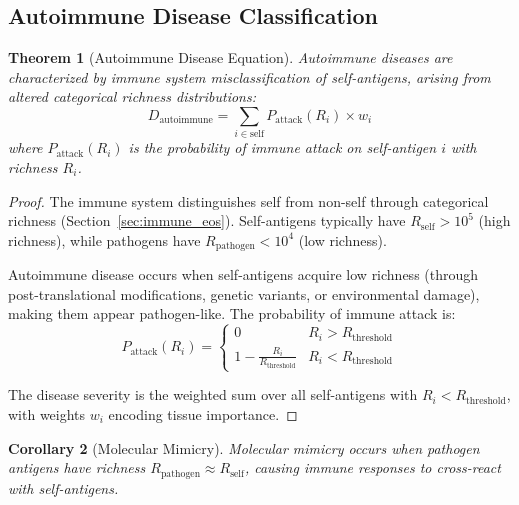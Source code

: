 \documentclass[11pt,twocolumn,a4paper]{article}
\newtheorem{theorem}{Theorem}[section]
\newtheorem{corollary}[theorem]{Corollary}
\theoremstyle{definition}
\theoremstyle{remark}
\begin{document}
\subsection{Autoimmune Disease Classification}

\begin{theorem}[Autoimmune Disease Equation]
\label{thm:autoimmune_disease}
Autoimmune diseases are characterized by immune system misclassification of self-antigens, arising from altered categorical richness distributions:
\begin{equation}
D_{\mathrm{autoimmune}} = \sum_{i \in \mathrm{self}} P_{\mathrm{attack}}(R_i) \times w_i
\label{eq:autoimmune_disease}
\end{equation}
where $P_{\mathrm{attack}}(R_i)$ is the probability of immune attack on self-antigen $i$ with richness $R_i$.
\end{theorem}

\begin{proof}
The immune system distinguishes self from non-self through categorical richness (Section~\ref{sec:immune_eos}). Self-antigens typically have $R_{\mathrm{self}} > 10^5$ (high richness), while pathogens have $R_{\mathrm{pathogen}} < 10^4$ (low richness).

Autoimmune disease occurs when self-antigens acquire low richness (through post-translational modifications, genetic variants, or environmental damage), making them appear pathogen-like. The probability of immune attack is:
\begin{equation}
P_{\mathrm{attack}}(R_i) = \begin{cases}
0 & R_i > R_{\mathrm{threshold}} \\
1 - \frac{R_i}{R_{\mathrm{threshold}}} & R_i < R_{\mathrm{threshold}}
\end{cases}
\label{eq:attack_probability}
\end{equation}

The disease severity is the weighted sum over all self-antigens with $R_i < R_{\mathrm{threshold}}$, with weights $w_i$ encoding tissue importance.
\end{proof}

\begin{corollary}[Molecular Mimicry]
\label{cor:molecular_mimicry}
Molecular mimicry occurs when pathogen antigens have richness $R_{\mathrm{pathogen}} \approx R_{\mathrm{self}}$, causing immune responses to cross-react with self-antigens.
\end{corollary}
\end{document}
